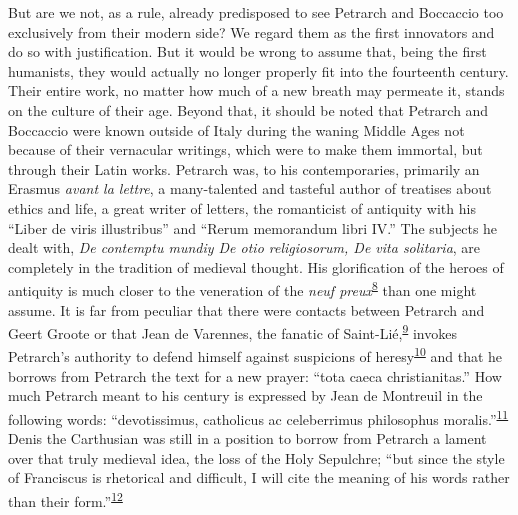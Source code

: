 \protect\hypertarget{22_Chapter_Fourteen__THE_COMING_OF.xhtmlux5cux23page_385}{}{}But
are we not, as a rule, already predisposed to see Petrarch and Boccaccio
too exclusively from their modern side? We regard them as the first
innovators and do so with justification. But it would be wrong to assume
that, being the first humanists, they would actually no longer properly
fit into the fourteenth century. Their entire work, no matter how much
of a new breath may permeate it, stands on the culture of their age.
Beyond that, it should be noted that Petrarch and Boccaccio were known
outside of Italy during the waning Middle Ages not because of their
vernacular writings, which were to make them immortal, but through their
Latin works. Petrarch was, to his contemporaries, primarily an Erasmus
\emph{avant la lettre}, a many-talented and tasteful author of treatises
about ethics and life, a great writer of letters, the romanticist of
antiquity with his ``Liber de viris illustribus'' and ``Rerum memorandum
libri IV.'' The subjects he dealt with, \emph{De contemptu mundiy De
otio religiosorum, De vita solitaria}, are completely in the tradition
of medieval thought. His glorification of the heroes of antiquity is
much closer to the veneration of the \emph{neuf
preux}\textsuperscript{\protect\hypertarget{22_Chapter_Fourteen__THE_COMING_OF.xhtmlux5cux23id_108}{\protect\hyperlink{23_NOTES.xhtmlux5cux23id_109}{8}}}
than one might assume. It is far from peculiar that there were contacts
between Petrarch and Geert Groote or that Jean de Varennes, the fanatic
of
Saint-Lié,\textsuperscript{\protect\hypertarget{22_Chapter_Fourteen__THE_COMING_OF.xhtmlux5cux23id_106}{\protect\hyperlink{23_NOTES.xhtmlux5cux23id_107}{9}}}
invokes Petrarch's authority to defend himself against suspicions of
heresy\textsuperscript{\protect\hypertarget{22_Chapter_Fourteen__THE_COMING_OF.xhtmlux5cux23id_104}{\protect\hyperlink{23_NOTES.xhtmlux5cux23id_105}{10}}}
and that he borrows from Petrarch the text for a new prayer: ``tota
caeca christianitas.'' How much Petrarch meant to his century is
expressed by Jean de Montreuil in the following words: ``devotissimus,
catholicus ac celeberrimus philosophus
moralis.''\textsuperscript{\protect\hypertarget{22_Chapter_Fourteen__THE_COMING_OF.xhtmlux5cux23id_102}{\protect\hyperlink{23_NOTES.xhtmlux5cux23id_103}{11}}}
Denis the Carthusian was still in a position to borrow from Petrarch a
lament over that truly medieval idea, the loss of the Holy Sepulchre;
``but since the style of Franciscus is rhetorical and difficult, I will
cite the meaning of his words rather than their
form.''\textsuperscript{\protect\hypertarget{22_Chapter_Fourteen__THE_COMING_OF.xhtmlux5cux23id_100}{\protect\hyperlink{23_NOTES.xhtmlux5cux23id_101}{12}}}

